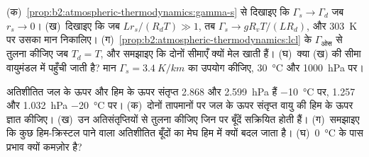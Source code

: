 \begin{exercise}[$\star\star\star$]\label{exo:b2:atmospheric-thermodynamics:11}
(क)~\cref{prop:b2:atmospheric-thermodynamics:gamma-s} से दिखाइए कि $\Gamma_s \to \Gamma_d$ जब $r_s \to 0$।
(ख)~दिखाइए कि जब $Lr_s/(R_dT) \gg 1$, तब $\Gamma_s \to gR_vT/(LR_d)$, और
\qty{303}{K} पर उसका मान निकालिए। (ग)~\cref{prop:b2:atmospheric-thermodynamics:lcl} के
$\Gamma_{\text{ओस}}$ से तुलना कीजिए जब $T_d = T$, और समझाइए कि दोनों सीमाएँ
क्यों मेल खाती हैं। (घ)~क्या (ख) की सीमा वायुमंडल में पहुँची जाती है? मान $\Gamma_s =
\qty{3.4}{K/km}$ का उपयोग कीजिए, \qty{30}{\celsius} और \qty{1000}{hPa} पर।
\end{exercise}

\begin{exercise}[$\star\star\star$]\label{exo:b2:atmospheric-thermodynamics:12}
अतिशीतित जल के ऊपर और हिम के ऊपर संतृप्त  2.868 और
\qty{2.599}{hPa} हैं \qty{-10}{\celsius} पर, 1.257 और \qty{1.032}{hPa} \qty{-20}{\celsius} पर।
(क)~दोनों तापमानों पर जल के ऊपर संतृप्त वायु की हिम के ऊपर  ज्ञात कीजिए। (ख)~उन
अतिसंतृप्तियों से तुलना कीजिए जिन पर बूँदें सक्रियित होती हैं। (ग)~समझाइए कि कुछ हिम-क्रिस्टल पाने वाला
अतिशीतित बूँदों का मेघ हिम में क्यों बदल जाता है। (घ)~\qty{0}{\celsius} के पास प्रभाव
क्यों कमज़ोर है?
\end{exercise}

